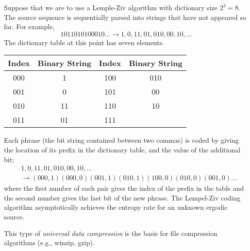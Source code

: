 \begin{example}
Suppose that we are to use a Lemple-Ziv algorithm with dictionary size $2^3 = 8$.
The source sequence is sequentially parsed into strings that have not appeared so far.
For example, 
\begin{equation*}
1011010100010 \ldots \rightarrow 1, 0, 11, 01, 010, 00, 10, \ldots
\end{equation*}
The dictionary table at this point has seven elements.

\begin{center}
\begin{tabular}{|c|c|c|c|}
\hline
Index & Binary String & Index & Binary String \\
\hline
000 & 1 & 100 & 010 \\
001 & 0 & 101 & 00 \\
010 & 11 & 110 & 10 \\
011 & 01 & 111 & \\
\hline
\end{tabular}
\end{center}

Each phrase (the bit string contained between two commas) is coded by giving the location of its prefix in the dictionary table, and the value of the additional bit;
\begin{equation*}
\begin{split}
& 1, 0, 11, 01, 010, 00, 10, \ldots \\
& \rightarrow (000, 1)(000, 0)(001, 1)(010, 1)(100, 0)(010, 0)(001, 0) \ldots
\end{split}
\end{equation*}
where the first number of each pair gives the index of the prefix in the table and the second number gives the last bit of the new phrase. 
The Lempel-Ziv coding algorithm asymptotically achieves the entropy rate for an unknown ergodic source.
\end{example}

This type of \emph{universal data compression} is the basis for file compression algorithms (e.g., winzip, gzip).
